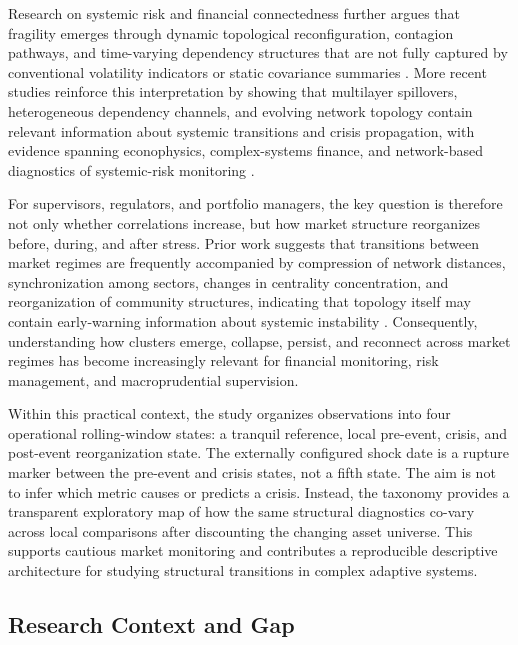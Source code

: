 \documentclass[a4paper,fleqn,review]{cas-sc}
\begin{document}
Research on systemic risk and financial connectedness further argues that fragility emerges through dynamic topological reconfiguration, contagion pathways, and time-varying dependency structures that are not fully captured by conventional volatility indicators or static covariance summaries \citep{billio2012econometric,bardoscia2017pathways}. More recent studies reinforce this interpretation by showing that multilayer spillovers, heterogeneous dependency channels, and evolving network topology contain relevant information about systemic transitions and crisis propagation, with evidence spanning econophysics, complex-systems finance, and network-based diagnostics of systemic-risk monitoring \citep{das2025covar,an2025regimeswitching,silva2016structure,huang2018systemic,ma2019diversification,alexandre2021drivers,clemente2022multilayer}.

For supervisors, regulators, and portfolio managers, the key question is therefore not only whether correlations increase, but how market structure reorganizes before, during, and after stress. Prior work suggests that transitions between market regimes are frequently accompanied by compression of network distances, synchronization among sectors, changes in centrality concentration, and reorganization of community structures, indicating that topology itself may contain early-warning information about systemic instability \citep{musmeci2015risk,billio2012econometric}. Consequently, understanding how clusters emerge, collapse, persist, and reconnect across market regimes has become increasingly relevant for financial monitoring, risk management, and macroprudential supervision.

Within this practical context, the study organizes observations into four operational rolling-window states: a tranquil reference, local pre-event, crisis, and post-event reorganization state. The externally configured shock date is a rupture marker between the pre-event and crisis states, not a fifth state. The aim is not to infer which metric causes or predicts a crisis. Instead, the taxonomy provides a transparent exploratory map of how the same structural diagnostics co-vary across local comparisons after discounting the changing asset universe. This supports cautious market monitoring and contributes a reproducible descriptive architecture for studying structural transitions in complex adaptive systems.

\subsection{Research Context and Gap}
\end{document}
